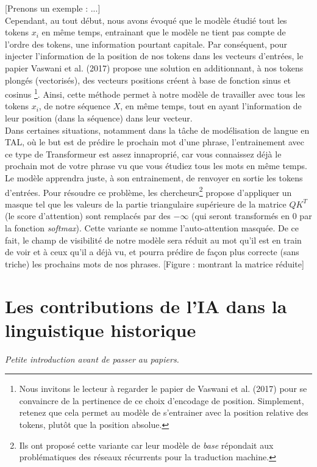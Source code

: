 \documentclass[12pt, french, twoside]{report}
\begin{document}
[Prenons un exemple : ...]\\

Cependant, au tout début, nous avons évoqué que le modèle étudié tout les tokens $x_i$ en même temps, entrainant que le modèle ne tient pas compte de l'ordre des tokens, une information pourtant capitale. Par conséquent, pour injecter l'information de la position de nos tokens dans les vecteurs d'entrées, le papier Vaswani et al. (2017)\cite{transformer} propose une solution en additionnant, à nos tokens plongés (vectorisés), des vecteurs positions créent à base de fonction sinus et cosinus \footnote{Nous invitons le lecteur à regarder le papier de Vaswani et al. (2017)\cite{transformer} pour se convaincre de la pertinence de ce choix d'encodage de position. Simplement, retenez que cela permet au modèle de s'entrainer avec la position relative des tokens, plutôt que la position absolue.}. Ainsi, cette méthode permet à notre modèle de travailler avec tous les tokens $x_i$, de notre séquence $X$, en même temps, tout en ayant l'information de leur position (dans la séquence) dans leur vecteur.\\

Dans certaines situations, notamment dans la tâche de modélisation de langue en TAL, où le but est de prédire le prochain mot d'une phrase, l'entrainement avec ce type de Transformeur est assez innaproprié, car vous connaissez déjà le prochain mot de votre phrase vu que vous étudiez tous les mots en même temps. Le modèle apprendra juste, à son entrainement, de renvoyer en sortie les tokens d'entrées. Pour résoudre ce problème, les chercheurs\footnote{Ils ont proposé cette variante car leur modèle de \textit{base} répondait aux problématiques des réseaux récurrents pour la traduction machine.} propose d'appliquer un masque tel que les valeurs de la partie triangulaire supérieure de la matrice $QK^T$ (le score d'attention) sont remplacés par des $-\infty$ (qui seront transformés en 0 par la fonction \textit{softmax}). Cette variante se nomme l'auto-attention masquée. De ce fait, le champ de visibilité de notre modèle sera réduit au mot qu'il est en train de voir et à ceux qu'il a déjà vu, et pourra prédire de façon plus correcte (sans triche) les prochains mots de nos phrases. [Figure : montrant la matrice réduite]

\chapter{Les contributions de l'IA dans la linguistique historique}
\textit{Petite introduction avant de passer au papiers.}
\end{document}
